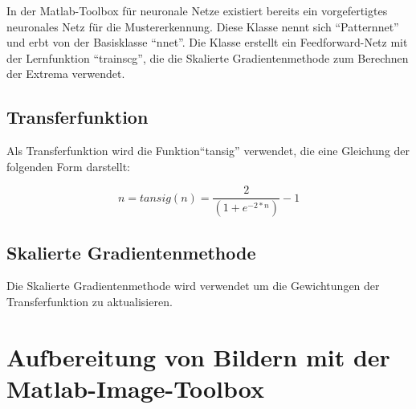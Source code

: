 In der Matlab-Toolbox für neuronale Netze existiert bereits ein vorgefertigtes
neuronales Netz für die Mustererkennung. Diese Klasse nennt sich ``Patternnet''
und erbt von der Basisklasse ``nnet''. Die Klasse erstellt ein Feedforward-Netz
mit der Lernfunktion ``trainscg'', die die Skalierte Gradientenmethode zum
Berechnen der Extrema verwendet.


\subsection{Transferfunktion}
 Als Transferfunktion wird die Funktion``tansig'' verwendet, die eine Gleichung der folgenden Form darstellt:

\begin{equation}
n = tansig(n) =  \frac{2}{(1 + e^{-2*n})} - 1
\end{equation}

\subsection{Skalierte Gradientenmethode}

Die Skalierte Gradientenmethode wird verwendet um die Gewichtungen der
Transferfunktion zu aktualisieren. 

\newpage
\section{Aufbereitung von Bildern mit der Matlab-Image-Toolbox}
\label{images}
